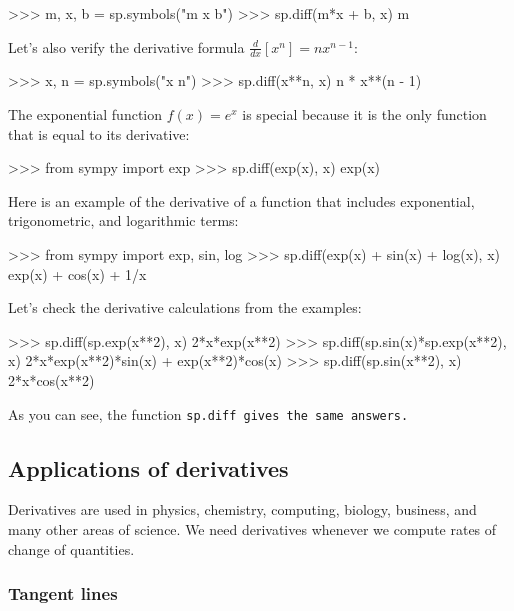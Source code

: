 		\begin{codeblock}
		>>> m, x, b = sp.symbols("m x b")
		>>> sp.diff(m*x + b, x)
		m
		\end{codeblock}

		\noindent		
		Let's also verify the derivative formula $\tfrac{d}{dx}[x^n] = nx^{n-1}$:

		\begin{codeblock}[]
		>>> x, n = sp.symbols("x n")
		>>> sp.diff(x**n, x)
		n * x**(n - 1)
		\end{codeblock}

		\noindent
		The exponential function $f(x)=e^x$ is special
		because it is the only function that is equal to its derivative:

		\begin{codeblock}[]
		>>> from sympy import exp
		>>> sp.diff(exp(x), x)
		exp(x)
		\end{codeblock}

		\noindent
		Here is an example of the derivative of a function
		that includes exponential, trigonometric, and logarithmic terms:
	
		\begin{codeblock}
		>>> from sympy import exp, sin, log
		>>> sp.diff(exp(x) + sin(x) + log(x), x)
		exp(x) + cos(x) + 1/x
		\end{codeblock}

		\noindent
		Let's check the derivative calculations from the examples:

		\begin{codeblock}[]
		>>> sp.diff(sp.exp(x**2), x)
		2*x*exp(x**2)
		>>> sp.diff(sp.sin(x)*sp.exp(x**2), x)
		2*x*exp(x**2)*sin(x) + exp(x**2)*cos(x)
		>>> sp.diff(sp.sin(x**2), x)
		2*x*cos(x**2)
		\end{codeblock}

		As you can see,
		the function \tt{sp.diff} gives the same answers.




	\subsection{Applications of derivatives}

		Derivatives are used in physics, chemistry, computing, biology, business,
		and many other areas of science.
		We need derivatives whenever we compute rates of change of quantities.


		\subsubsection{Tangent lines}

